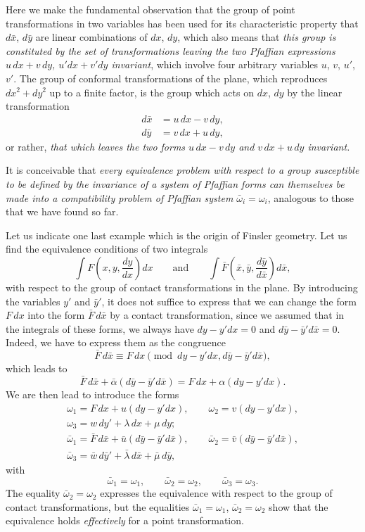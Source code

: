 \documentclass[leqno,11pt]{article}
\theoremstyle{shape1}
\theoremstyle{shape0}
\theoremstyle{shape2}
\theoremstyle{definition}
\begin{document}
Here we make the fundamental observation that the group of point transformations in two variables has been used for its characteristic property that $d\bar x$, $d\bar y$ are linear combinations of $dx$, $dy$, which also means that \emph{this group is constituted by the set of transformations leaving the two Pfaffian expressions $u\,dx+v\,dy$, $u'dx+v'dy$ invariant}, which involve four arbitrary variables $u$, $v$, $u'$, $v'$. The group of conformal transformations of the plane, which reproduces $dx^{2}+dy^{2}$ up to a finite factor, is the group which acts on $dx$, $dy$ by the linear transformation
\begin{align*}
  d\bar x&=u\,dx-v\,dy,\\
  d\bar y&=v\,dx+u\,dy,
\end{align*}
or rather, \emph{that which leaves the two forms $u\,dx-v\,dy$ and $v\,dx+u\,dy$ invariant.}

It is conceivable that \emph{every equivalence problem with respect to a group susceptible to be defined by the invariance of a system of Pfaffian forms can themselves be made into a compatibility problem of Pfaffian system $\bar\omega_{i}=\omega_{i}$}, analogous to those that we have found so far.

Let us indicate one last example which is the origin of Finsler geometry. Let us find the equivalence conditions of two integrals
\[
\int F\left(x,y,\frac{dy}{dx}\right)dx\qquad\text{and}\qquad
\int\bar F\left(\bar x,\bar y,\frac{d\bar y}{d\bar x}\right)d\bar x,
\]
with respect to the group of contact transformations in the plane. By introducing the variables $y'$ and $\bar y'$, it does not suffice to express that we can change the form $F\,dx$ into the form $\bar F\,d\bar x$ by a contact transformation, since we assumed that in the integrals of these forms, we always have $dy-y'dx=0$ and $d\bar y-\bar y'd\bar x=0$. Indeed, we have to express them as the congruence
\[
\bar F\,d\bar x\equiv F\,dx\pmod{dy-y'dx,d\bar y-\bar y'd\bar x},
\]
which leads to 
\[
\bar F\,d\bar x+\bar\alpha(d\bar y-\bar y'd\bar x)= F\,dx+\alpha(dy-y'dx).
\]
We are then lead to introduce the forms
\begin{gather*}
  \omega_{1}=F\,dx+u(dy-y'dx),\qquad\omega_{2}=v(dy-y'dx),\\
  \omega_{3}=w\,dy'+\lambda\,dx+\mu\,dy;\\
  \bar\omega_{1}=\bar F\,d\bar x+\bar u(d\bar y-\bar y'd\bar x),\qquad\bar\omega_{2}=\bar v(d\bar y-\bar y'd\bar x),\\
  \bar\omega_{3}=\bar w\,d\bar y'+\bar\lambda\,d\bar x+\bar\mu\,d\bar y,
\end{gather*}
with
\[
\bar\omega_{1}=\omega_{1},\qquad\bar\omega_{2}=\omega_{2},\qquad\bar\omega_{3}=\omega_{3}.
\]
The equality $\bar\omega_{2}=\omega_{2}$ expresses the equivalence with respect to the group of contact transformations, but the equalities $\bar\omega_{1}=\omega_{1}$, $\bar\omega_{2}=\omega_{2}$ show that the equivalence holds \emph{effectively} for a point transformation.
\end{document}
